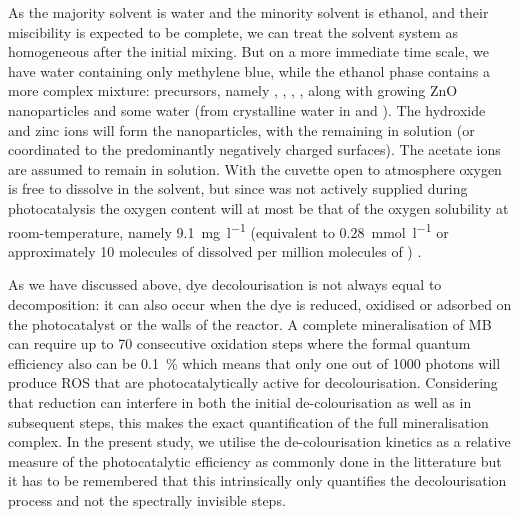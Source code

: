 \documentclass[9pt,twoside,twocolumn]{article}\usepackage{knitr}
\begin{document}
\begin{refsection}
As the majority solvent is water and the minority solvent is ethanol, and their miscibility is expected to be complete, we can treat the solvent system as homogeneous after the initial mixing. 
But on a more immediate time scale, we have water containing only methylene blue, while the ethanol phase contains a more complex mixture: precursors, namely , , , , along with growing ZnO nanoparticles and some water (from crystalline water in  and ).
The hydroxide and zinc ions will form the  nanoparticles, with the  remaining in solution (or coordinated to the predominantly negatively charged  surfaces).
The acetate ions are assumed to remain in solution. 
With the cuvette open to atmosphere oxygen is free to dissolve in the solvent, but since  was not actively supplied during photocatalysis the oxygen content will at most be that of the oxygen solubility at room-temperature, namely \qty{9.1}{\mg\per\litre} (equivalent to \qty{0.28}{\mmol\per\litre} or approximately 10 molecules of dissolved  per million molecules of ) \cite{Hitchman1978,water2018}.

As we have discussed above, dye decolourisation is not always equal to decomposition: it can also occur when the dye is reduced, oxidised or adsorbed on the photocatalyst or the walls of the reactor. 
A complete mineralisation of MB can require up to 70 consecutive oxidation steps where the formal quantum efficiency also can be \qty{0.1}{\percent} which means that only one out of \num{1000} photons will produce ROS that are photocatalytically active \cite{Jacobsson2012} for decolourisation. 
Considering that reduction can interfere in both the initial de-colourisation as well as in subsequent steps, this makes the exact quantification of the full mineralisation complex. 
In the present study, we utilise the de-colourisation kinetics as a relative measure of the photocatalytic efficiency as commonly done in the litterature but it has to be remembered that this intrinsically only quantifies the decolourisation process and not the spectrally invisible steps.


\end{refsection}
\end{document}
